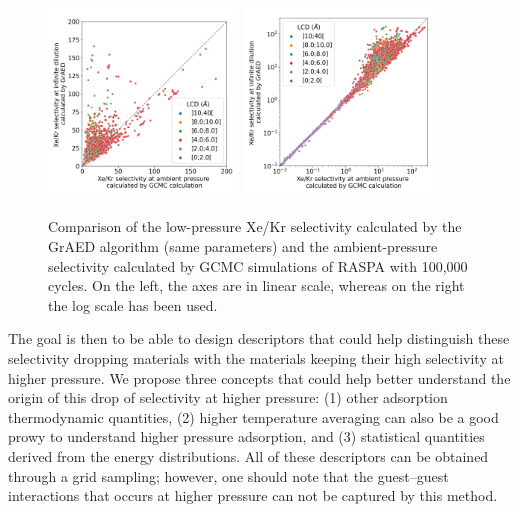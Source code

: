 \documentclass[main]{subfiles}
\begin{document}
\begin{figure}[ht]
  \centering
    \includegraphics[width=0.45\textwidth]{figures/3-fastsim/s_2080_vs_s_0_grid_overview.jpg}
    \includegraphics[width=0.45\textwidth]{figures/3-fastsim/s_2080_vs_s_0_grid_overview_log.jpg}
    \caption{Comparison of the low-pressure Xe/Kr selectivity calculated by the GrAED algorithm (same parameters) and the ambient-pressure selectivity calculated by GCMC simulations of RASPA with 100,000 cycles. On the left, the axes are in linear scale, whereas on the right the log scale has been used. }\label{fgr:grid_ambient_selectivity}
\end{figure}

The goal is then to be able to design descriptors that could help distinguish these selectivity dropping materials with the materials keeping their high selectivity at higher pressure. We propose three concepts that could help better understand the origin of this drop of selectivity at higher pressure: (1) other adsorption thermodynamic quantities, (2) higher temperature averaging can also be a good prowy to understand higher pressure adsorption, and (3) statistical quantities derived from the energy distributions. All of these descriptors can be obtained through a grid sampling; however, one should note that the guest--guest interactions that occurs at higher pressure can not be captured by this method.
\end{document}
